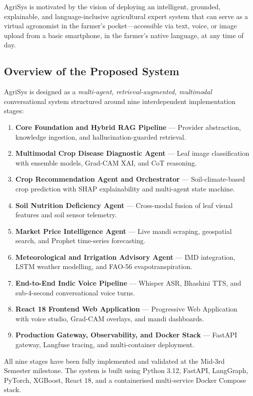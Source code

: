 \documentclass[12pt,a4paper]{article}
\begin{document}
AgriSys is motivated by the vision of deploying an intelligent, grounded, explainable, and language-inclusive agricultural expert system that can serve as a virtual agronomist in the farmer's pocket---accessible via text, voice, or image upload from a basic smartphone, in the farmer's native language, at any time of day.

\subsection{Overview of the Proposed System}

AgriSys is designed as a \textit{multi-agent, retrieval-augmented, multimodal} conversational system structured around nine interdependent implementation stages:

\begin{enumerate}[label=\textbf{Stage \arabic*:}]
\item \textbf{Core Foundation and Hybrid RAG Pipeline} --- Provider abstraction, knowledge ingestion, and hallucination-guarded retrieval.
\item \textbf{Multimodal Crop Disease Diagnostic Agent} --- Leaf image classification with ensemble models, Grad-CAM XAI, and CoT reasoning.
\item \textbf{Crop Recommendation Agent and Orchestrator} --- Soil-climate-based crop prediction with SHAP explainability and multi-agent state machine.
\item \textbf{Soil Nutrition Deficiency Agent} --- Cross-modal fusion of leaf visual features and soil sensor telemetry.
\item \textbf{Market Price Intelligence Agent} --- Live mandi scraping, geospatial search, and Prophet time-series forecasting.
\item \textbf{Meteorological and Irrigation Advisory Agent} --- IMD integration, LSTM weather modelling, and FAO-56 evapotranspiration.
\item \textbf{End-to-End Indic Voice Pipeline} --- Whisper ASR, Bhashini TTS, and sub-4-second conversational voice turns.
\item \textbf{React 18 Frontend Web Application} --- Progressive Web Application with voice studio, Grad-CAM overlays, and mandi dashboards.
\item \textbf{Production Gateway, Observability, and Docker Stack} --- FastAPI gateway, Langfuse tracing, and multi-container deployment.
\end{enumerate}

All nine stages have been fully implemented and validated at the Mid-3rd Semester milestone. The system is built using Python 3.12, FastAPI, LangGraph, PyTorch, XGBoost, React 18, and a containerised multi-service Docker Compose stack.
\end{document}
